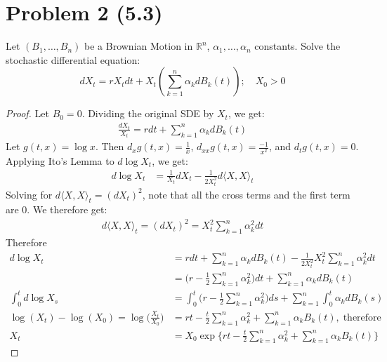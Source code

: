 \documentclass[11pt]{article}
\newcommand{\bbr}{\mathbb{R}}
\newcommand\ip[2]{\langle #1, #2 \rangle}
\newcommand{\ga}{\alpha}
\begin{document}
 \section*{Problem 2 (5.3)}
 Let $(B_1,\ldots,B_n)$ be a Brownian Motion in $\bbr^n$, $\ga_1, \ldots, \ga_n$ constants.  Solve the stochastic differential equation: $$
d X _ { t } = r X _ { t } d t + X _ { t } \left( \sum _ { k = 1 } ^ { n } \alpha _ { k } d B _ { k } ( t ) \right) ; \quad X _ { 0 } > 0
$$
 \begin{proof}Let $B_0=0$.  Dividing the original SDE by $X_t$, we get: 
 \begin{align*}
 \frac{dX_t}{X_t} = r dt + \sum_{k=1}^n \ga_k dB_k(t)
 \end{align*}
 Let $g(t,x)=\log x$.  Then $d_{x} g(t,x) = \frac{1}{x}$, $d_{xx} g(t,x) = \frac{-1}{x^2}$, and $d_{t}g(t,x) = 0$.  Applying Ito's Lemma to $d \log X_t$, we get:
 \begin{align*}
 d \log X_t &= \frac{1}{X_t} dX_t -\frac{1}{2X_t^2} d \ip{X}{X}_t 
 \end{align*}
 Solving for $d \ip{X}{X}_t = (d X_t)^2$, note that all the cross terms and the first term are 0.   We therefore get:
 \begin{align*}
 d \ip{X}{X}_t=(dX_t)^2 = X_t^2 \sum_{k=1}^n \ga_k^2 dt
 \end{align*}
 Therefore
 \begin{align*}
 d \log X_t &= rdt + \sum_{k=1}^n \ga_k dB_k(t) - \frac{1}{2X_t^2} X_t^2 \sum_{k=1}^n \ga_k^2 dt\\
 &= \Big( r - \frac{1}{2} \sum_{k=1}^n \ga_k^2 \Big) dt + \sum_{k=1}^n \ga_kdB_k(t)\\
 \int_0^t d \log X_s &= \int_0^t  \Big( r - \frac{1}{2} \sum_{k=1}^n \ga_k^2 \Big) ds + \sum_{k=1}^n \int_0^t \ga_k dB_k(s)\\
 \log(X_t)-\log(X_0)=\log \Big(\frac{X_t}{X_0}\Big)&=  rt - \frac{t}{2} \sum_{k=1}^n \ga_k^2 + \sum_{k=1}^n \ga_k B_k(t), \; \text{therefore}\\
 X_t &= X_0 \exp \Big\{ rt-\frac{t}{2}\sum_{k=1}^n \ga_k^2 + \sum_{k=1}^n \ga_k B_k(t) \Big\}
 \end{align*}
 \end{proof}
\end{document}
